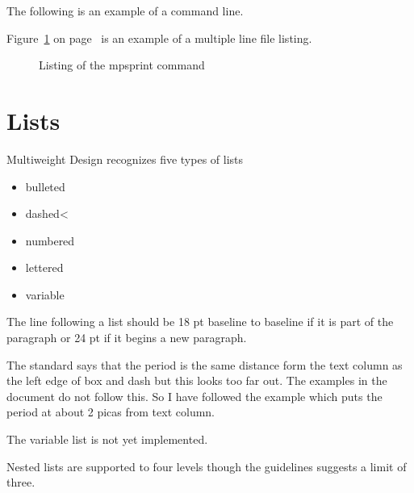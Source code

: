 The following is an example of a command line.
\begin{figure}[h]
\end{figure}

Figure~\ref{fig:mpsprint} on page~\pageref{fig:mpsprint} is an example of
a multiple line file listing. 

\begin{figure}[htbp]
\caption{\label{fig:mpsprint}Listing of the mpsprint command}
\end{figure}

\section{Lists}


Multiweight Design recognizes five types of lists

\begin{itemize}
  \item[\squarebullet]bulleted
  \item[---]dashed< 
  \item[1.]numbered
  \item[a.]lettered
  \item[a string]variable
\end{itemize}

The line following a list should be 18 pt baseline to baseline if it
is part of the paragraph or 24 pt if it begins a new paragraph. 


The standard says that the period is the same distance form the text column as 
the left edge of box and dash but this looks too far out. The examples
in the document do not follow this. So I have followed the example
which puts the period at about 2 picas from text column.


The variable list is not yet implemented.


Nested lists are supported to four levels though the guidelines
suggests a limit of three.


